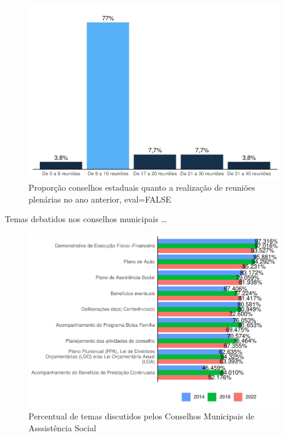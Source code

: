 \documentclass[
  brazilian]{report}
\begin{document}
\begin{figure}
\includegraphics{Censo-SUAS-2022_files/figure-latex/qtdceas_reuniao-1} \caption[Proporção conselhos estaduais quanto a realização de reuniões plenárias no ano anterior, eval=FALSE]{Proporção conselhos estaduais quanto a realização de reuniões plenárias no ano anterior, eval=FALSE}\label{fig:qtdceas_reuniao}
\end{figure}

Temas debatidos nos conselhos municipais \ldots{}

\begin{figure}
\includegraphics{Censo-SUAS-2022_files/figure-latex/temas_cmas-1} \caption[Percentual de temas discutidos pelos Conselhos Municipais de Asssistência Social]{Percentual de temas discutidos pelos Conselhos Municipais de Asssistência Social}\label{fig:temas_cmas}
\end{figure}
\end{document}
